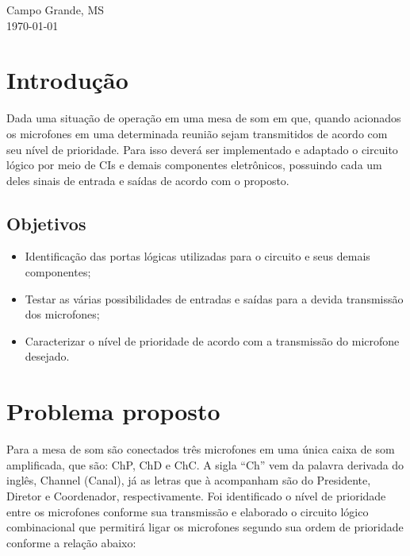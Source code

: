 \documentclass{article}
\begin{document}
\begin{titlepage}
	\vfill\vfill\vfill\vfill\vfill\vfill\vfill %
	
	{\large{Campo Grande, MS}\\
	\today} %




	\vfill %

\end{titlepage}

\section{Introdução}

Dada uma situação de operação em uma mesa de som em que, quando acionados os microfones em uma determinada reunião sejam transmitidos de acordo com seu nível de prioridade. Para isso deverá ser implementado e adaptado o circuito lógico por meio de CIs e demais componentes eletrônicos, possuindo cada um deles sinais de entrada e saídas de acordo com o proposto.

\subsection{Objetivos}
\begin{itemize}
	\item  Identificação das portas lógicas utilizadas para o circuito e seus demais componentes;
	\item  Testar as várias possibilidades de entradas e saídas para a devida transmissão dos microfones;
	\item  Caracterizar o nível de prioridade de acordo com a transmissão do microfone desejado.
\end{itemize}

\section{Problema proposto}
Para a mesa de som são conectados três microfones em uma única caixa de som amplificada, que são: ChP, ChD e ChC. A sigla “Ch” vem da palavra derivada do inglês, Channel (Canal), já as letras que à acompanham são do Presidente, Diretor e Coordenador, respectivamente. Foi identificado o nível de prioridade entre os microfones conforme sua transmissão e elaborado o circuito lógico combinacional que permitirá ligar os microfones segundo sua ordem de prioridade conforme a relação abaixo:
\end{document}
